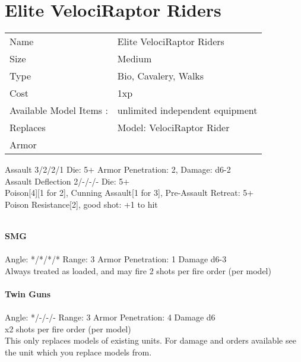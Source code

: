 






\pagebreak

\section{ Elite VelociRaptor Riders }

\begin{tabular}{ll}
  Name & Elite VelociRaptor Riders \\
  Size & Medium\\
  Type & Bio, Cavalery, Walks\\
  Cost & 1xp\\
  Available Model Items : &unlimited independent equipment\\
  Replaces & Model: VelociRaptor Rider\\
  Armor & 
\end{tabular}



Assault 3/2/2/1 Die: 5+ Armor Penetration: 2, Damage: d6-2 \\
Assault Deflection 2/-/-/- Die: 5+\\
Poison[4][1 for 2], Cunning Assault[1 for 3], Pre-Assault Retreat: 5+
\ \\

Poison Resistance[2], good shot: +1 to hit

\ \\
{\bf SMG } \\
\ \\
Angle: */*/*/* Range: 3 Armor Penetration: 1 Damage d6-3 \\
\indent Always treated as loaded, and may fire 2 shots per fire order (per model) \\



\ \\
{\bf Twin Guns } \\
\ \\
Angle: */-/-/- Range: 3 Armor Penetration: 4 Damage d6 \\
\indent x2 shots per fire order (per model) \\





This only replaces models of existing units. For damage and orders available see the unit which you replace models from.



